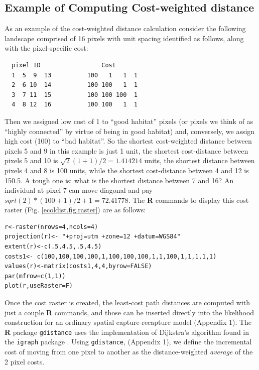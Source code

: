 \documentclass[12pt]{article}
\begin{document}
\subsection{Example of Computing Cost-weighted distance}

As an example of the cost-weighted distance calculation consider the
following landscape comprised of 16 pixels with unit spacing
identified as follows, along with the pixel-specific cost:
\begin{center}
\begin{verbatim}
  pixel ID                 Cost
  1  5  9  13          100   1   1  1
  2  6 10  14          100 100   1  1
  3  7 11  15          100 100 100  1
  4  8 12  16          100 100   1  1
\end{verbatim}
\end{center}
Then we assigned low cost of 1 to ``good habitat'' pixels (or pixels we
think of as ``highly connected'' by virtue of being in good habitat)
and, conversely, we assign high cost (100) to ``bad habitat''. So the
shortest cost-weighted distance between pixels 5 and 9 in this example
is just 1 unit, the shortest cost-distance between pixels 5 and 10 is
$\sqrt{2}(1+1)/2 = 1.414214$ units, the shortest distance between pixels 4 and 8 is 100
units, while the shortest cost-distance between 4 and 12 is 150.5. A
tough one is: what is the shortest distance between 7 and 16? An
individual at pixel 7 can move diagonal and pay  $sqrt(2)*(100+1)/2 + 1 =72.41778$.
The {\bf R} commands to display this cost raster
(Fig. \ref{ecoldist.fig.raster})  are as follows:
\begin{verbatim}
r<-raster(nrows=4,ncols=4)
projection(r)<- "+proj=utm +zone=12 +datum=WGS84"
extent(r)<-c(.5,4.5,.5,4.5)
costs1<- c(100,100,100,100,1,100,100,100,1,1,100,1,1,1,1,1)
values(r)<-matrix(costs1,4,4,byrow=FALSE)
par(mfrow=c(1,1))
plot(r,useRaster=F)
\end{verbatim}
Once the cost raster is created, the least-cost path distances are
computed with just a couple {\bf R} commands, and those can be
inserted directly into the likelihood construction for an ordinary
spatial capture-recapture model (Appendix 1). The {\bf R} package
\mbox{\tt gdistance} uses 
 the implementation of Dijkstra's algorithm
\citep{dijkstra:1959} found in the \mbox{\tt igraph} package
\citep{csardi:2010}.
Using \mbox{\tt gdistance}, (Appendix 1),
we define the incremental cost of moving
from one pixel to another as the distance-weighted {\it
  average} of the 2 pixel costs.
\end{document}
